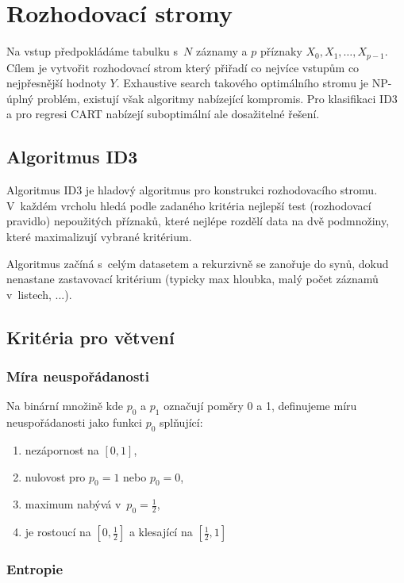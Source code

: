 \section{Rozhodovací stromy}

Na vstup předpokládáme tabulku s~$N$ záznamy a $p$ příznaky $X_0, X_1, \dots, X_{p-1}$. Cílem je vytvořit rozhodovací strom který přiřadí co nejvíce vstupům co nejpřesnější hodnoty $Y$. Exhaustive search takového optimálního stromu je NP-úplný problém, existují však algoritmy nabízející kompromis. Pro klasifikaci ID3 a pro regresi CART nabízejí suboptimální ale dosažitelné řešení.

\subsection{Algoritmus ID3}

Algoritmus ID3 je hladový algoritmus pro konstrukci rozhodovacího stromu. V~každém vrcholu hledá podle zadaného kritéria nejlepší test (rozhodovací pravidlo) nepoužitých příznaků, které nejlépe rozdělí data na dvě podmnožiny, které maximalizují vybrané kritérium.

Algoritmus začíná s~celým datasetem a rekurzivně se zanořuje do synů, dokud nenastane zastavovací kritérium (typicky max hloubka, malý počet záznamů v~listech, ...).

\subsection{Kritéria pro větvení}

\subsubsection{Míra neuspořádanosti}

Na binární množině kde $p_0$ a $p_1$ označují poměry 0 a 1, definujeme míru neuspořádanosti jako funkci $p_0$ splňující:
\begin{enumerate}
    \item nezápornost na $[0, 1]$,
    \item nulovost pro $p_0 = 1$ nebo $p_0 = 0$,
    \item maximum nabývá v~$p_0 = \frac{1}{2}$,
    \item je rostoucí na $\left[0, \frac{1}{2}\right]$ a klesající na $\left[\frac{1}{2}, 1\right]$
\end{enumerate}

\subsubsection{Entropie}


